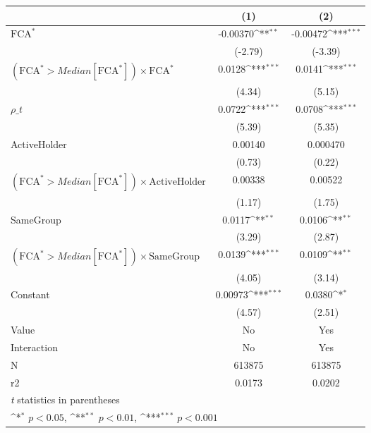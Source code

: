 {
\def\sym#1{\ifmmode^{#1}\else\(^{#1}\)\fi}
\begin{tabular}{l*{2}{c}}
\hline\hline
                    &\multicolumn{1}{c}{(1)}         &\multicolumn{1}{c}{(2)}         \\
\hline
$ \text{FCA}^* $    &    -0.00370\sym{**} &    -0.00472\sym{***}\\
                    &     (-2.79)         &     (-3.39)         \\
[1em]
 $ (\text{FCA}^* > Median[\text{FCA}^*]) \times {\text{FCA} ^*}  $ &      0.0128\sym{***}&      0.0141\sym{***}\\
                    &      (4.34)         &      (5.15)         \\
[1em]
$ \rho\_t $          &      0.0722\sym{***}&      0.0708\sym{***}\\
                    &      (5.39)         &      (5.35)         \\
[1em]
ActiveHolder        &     0.00140         &    0.000470         \\
                    &      (0.73)         &      (0.22)         \\
[1em]
 $ (\text{FCA}^* > Median[\text{FCA}^*]) \times {\text{ActiveHolder} }  $ &     0.00338         &     0.00522         \\
                    &      (1.17)         &      (1.75)         \\
[1em]
SameGroup           &      0.0117\sym{**} &      0.0106\sym{**} \\
                    &      (3.29)         &      (2.87)         \\
[1em]
 $ (\text{FCA}^* > Median[\text{FCA}^*]) \times {\text{SameGroup} }  $ &      0.0139\sym{***}&      0.0109\sym{**} \\
                    &      (4.05)         &      (3.14)         \\
[1em]
Constant            &     0.00973\sym{***}&      0.0380\sym{*}  \\
                    &      (4.57)         &      (2.51)         \\
\hline
Value               &          No         &         Yes         \\
Interaction         &          No         &         Yes         \\
N                   &      613875         &      613875         \\
r2                  &      0.0173         &      0.0202         \\
\hline\hline
\multicolumn{3}{l}{\footnotesize \textit{t} statistics in parentheses}\\
\multicolumn{3}{l}{\footnotesize \sym{*} \(p<0.05\), \sym{**} \(p<0.01\), \sym{***} \(p<0.001\)}\\
\end{tabular}
}

